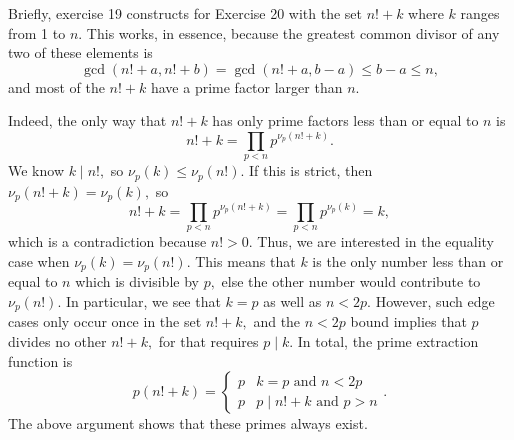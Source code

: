 Briefly, exercise 19 constructs for Exercise 20 with the set $n!+k$ where $k$ ranges from 1 to $n.$ This works, in essence, because the greatest common divisor of any two of these elements is
\[\gcd(n!+a,n!+b)=\gcd(n!+a,b-a)\le b-a\le n,\]
and most of the $n!+k$ have a prime factor larger than $n.$

Indeed, the only way that $n!+k$ has only prime factors less than or equal to $n$ is
\[n!+k=\prod_{p<n}p^{\nu_p(n!+k)}.\]
We know $k\mid n!,$ so $\nu_p(k)\le\nu_p(n!).$ If this is strict, then $\nu_p(n!+k)=\nu_p(k),$ so
\[n!+k=\prod_{p<n}p^{\nu_p(n!+k)}=\prod_{p<n}p^{\nu_p(k)}=k,\]
which is a contradiction because $n!>0.$ Thus, we are interested in the equality case when $\nu_p(k)=\nu_p(n!).$ This means that $k$ is the only number less than or equal to $n$ which is divisible by $p,$ else the other number would contribute to $\nu_p(n!).$ In particular, we see that $k=p$ as well as $n<2p.$ However, such edge cases only occur once in the set $n!+k,$ and the $n<2p$ bound implies that $p$ divides no other $n!+k,$ for that requires $p\mid k.$ In total, the prime extraction function is
\[p(n!+k)=\begin{cases}
    p & k=p\text{ and }n<2p \\
    p & p\mid n!+k\text{ and }p>n
\end{cases}.\]
The above argument shows that these primes always exist.